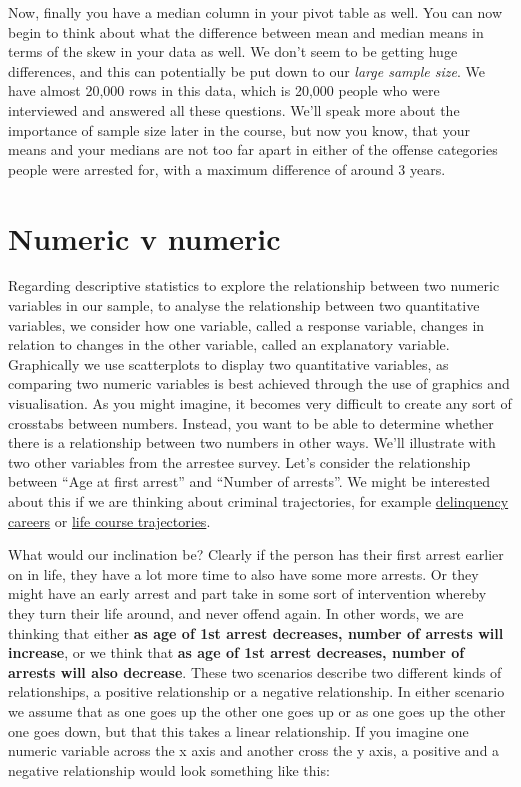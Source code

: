 \documentclass[
]{book}
\begin{document}
Now, finally you have a median column in your pivot table as well. You can now begin to think about what the difference between mean and median means in terms of the skew in your data as well. We don't seem to be getting huge differences, and this can potentially be put down to our \emph{large sample size}. We have almost 20,000 rows in this data, which is 20,000 people who were interviewed and answered all these questions. We'll speak more about the importance of sample size later in the course, but now you know, that your means and your medians are not too far apart in either of the offense categories people were arrested for, with a maximum difference of around 3 years.

\hypertarget{numeric-v-numeric}{%
\section{Numeric v numeric}\label{numeric-v-numeric}}

Regarding descriptive statistics to explore the relationship between two numeric variables in our sample, to analyse the relationship between two quantitative variables, we consider how one variable, called a response variable, changes in relation to changes in the other variable, called an explanatory variable. Graphically we use scatterplots to display two quantitative variables, as comparing two numeric variables is best achieved through the use of graphics and visualisation. As you might imagine, it becomes very difficult to create any sort of crosstabs between numbers. Instead, you want to be able to determine whether there is a relationship between two numbers in other ways. We'll illustrate with two other variables from the arrestee survey. Let's consider the relationship between ``Age at first arrest'' and ``Number of arrests''. We might be interested about this if we are thinking about criminal trajectories, for example \href{http://www.journals.uchicago.edu/doi/abs/10.1086/449107}{delinquency careers} or \href{http://onlinelibrary.wiley.com/doi/10.1111/j.1745-9125.1995.tb01173.x/full}{life course trajectories}.

What would our inclination be? Clearly if the person has their first arrest earlier on in life, they have a lot more time to also have some more arrests. Or they might have an early arrest and part take in some sort of intervention whereby they turn their life around, and never offend again. In other words, we are thinking that either \textbf{as age of 1st arrest decreases, number of arrests will increase}, or we think that \textbf{as age of 1st arrest decreases, number of arrests will also decrease}. These two scenarios describe two different kinds of relationships, a positive relationship or a negative relationship. In either scenario we assume that as one goes up the other one goes up or as one goes up the other one goes down, but that this takes a linear relationship. If you imagine one numeric variable across the x axis and another cross the y axis, a positive and a negative relationship would look something like this:
\end{document}
